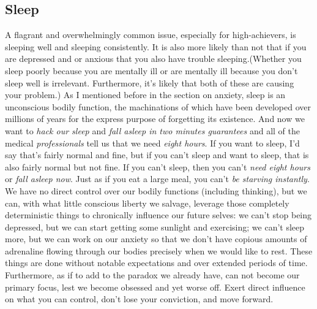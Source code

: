 \documentclass{book}
\numberwithin{equation}{section}
\begin{document}
\subsection{Sleep}
A flagrant and overwhelmingly common issue, especially for high-achievers, is sleeping well and sleeping consistently. It is also more likely than not that if you are depressed and or anxious that you also have trouble sleeping.(Whether you sleep poorly because you are mentally ill or are mentally ill because you don't sleep well is irrelevant. Furthermore, it's likely that both of these are causing your problem.) As I mentioned before in the section on anxiety, sleep is an unconscious bodily function, the machinations of which have been developed over millions of years for the express purpose of forgetting its existence. And now we want to \emph{hack our sleep} and \emph{fall asleep in two minutes guarantees} and all of the medical \emph{professionals} tell us that we need \emph{eight hours}. If you want to sleep, I'd say that's fairly normal and fine, but if you can't sleep and want to sleep, that is also fairly normal but not fine. If you can't sleep, then you can't \emph{need eight hours} or \emph{fall asleep now}. Just as if you eat a large meal, you can't \emph{be starving instantly}. We have no direct control over our bodily functions (including thinking), but we can, with what little conscious liberty we salvage, leverage those completely deterministic things to chronically influence our future selves: we can't stop being depressed, but we can start getting some sunlight and exercising; we can't sleep more, but we can work on our anxiety so that we don't have copious amounts of adrenaline flowing through our bodies precisely when we would like to rest. These things are done without notable expectations and over extended periods of time. Furthermore, as if to add to the paradox we already have, can not become our primary focus, lest we become obsessed and yet worse off. Exert direct influence on what you can control, don't lose your conviction, and move forward.
\end{document}
